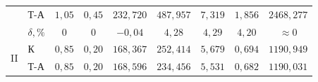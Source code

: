 \documentclass[14pt,oneside,final]{extreport}
\begin{document}
\begin{table}[]
{\begin{tabular}{|c|l|c|c|c|c|c|c|c|}
								   & Т-А            & $ 1,05 $                                                                                     & $ 0,45 $                                                                            & $ 232,720 $                                                                                     & $487,957 $                                                                                 & $7,319$                                                                                      & $1,856$                                                                                             & $2468,277$                                                                                        \\ \cline{2-9} 
							       & $ \delta, \% $ & $ 0 $                                                                                   	   & $ 0 $                                                                               & $ -0,04 $                                                                                       & $4,28    $                                                                                 & $4,29$                                                                                       & $4,20$                                                                                              & $ \approx 0 $                                                                                     \\ \hline
			\multirow{3}{*}{II}    & К              & $ 0,85 $                                                                                     & $ 0,20 $                                                                            & $ 168,367 $                                                                                     & $252,414 $                                                                                 & $5,679$                                                                                      & $0,694$                                                                                             & $1190,949$                                                                                        \\ \cline{2-9} 
								   & Т-А            & $ 0,85 $                                                                                     & $ 0,20 $                                                                            & $ 168,596 $                                                                                     & $234,456 $                                                                                 & $5,531$                                                                                      & $0,682$                                                                                             & $1190,031$                                                                                        \\ \cline{2-9} 

\end{tabular}}
\end{table}
\end{document}
